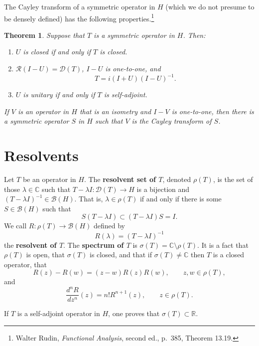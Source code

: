 \documentclass{article}
\newtheorem{theorem}{Theorem}
\theoremstyle{definition}
\begin{document}
The Cayley transform of a symmetric operator in $H$ (which we do not presume to be densely defined) has the following properties.\footnote{Walter
Rudin, {\em Functional Analysis}, second ed., p.~385, Theorem 13.19.}

\begin{theorem}
Suppose that $T$ is a symmetric operator in $H$. Then:
\begin{enumerate}
\item $U$ is closed if and only if $T$ is closed.
\item $\mathscr{R}(I-U)=\mathscr{D}(T)$, $I-U$ is one-to-one, and 
\[
T=i(I+U)(I-U)^{-1}.
\]
\item $U$ is unitary if and only if $T$ is self-adjoint.
\end{enumerate}

If $V$ is an operator in $H$ that is an isometry and $I-V$ is one-to-one, then there is a symmetric operator $S$ in $H$ such that
$V$ is the Cayley transform of $S$.
\end{theorem}



\section{Resolvents}
Let $T$ be an operator in $H$. The \textbf{resolvent set of $T$}, denoted $\rho(T)$, is the set of those $\lambda \in \mathbb{C}$ such
that $T-\lambda I:\mathscr{D}(T) \to H$ is a bijection and $(T-\lambda I)^{-1} \in \mathscr{B}(H)$. That is, $\lambda \in \rho(T)$ if and
only if there is some $S \in \mathscr{B}(H)$ such that
\[
S(T-\lambda I) \subset (T-\lambda I)S = I.
\]
We call $R:\rho(T) \to \mathscr{B}(H)$ defined by 
\[
R(\lambda) = (T-\lambda I)^{-1}
\]
the \textbf{resolvent  of $T$}.
The \textbf{spectrum of $T$} is $\sigma(T)=\mathbb{C} \setminus \rho(T)$.  It is a fact that 
$\rho(T)$ is open, that $\sigma(T)$ is closed, and that
if $\sigma(T) \neq \mathbb{C}$ then
$T$ is a closed operator, that
\[
R(z)-R(w) = (z-w)R(z)R(w), \qquad z,w \in \rho(T),
\]
and
\[
\frac{d^n R}{dz^n}(z) = n! R^{n+1}(z), \qquad z \in \rho(T).
\]

If $T$ is a self-adjoint operator in $H$, one proves that $\sigma(T) \subset \mathbb{R}$. 
\end{document}
